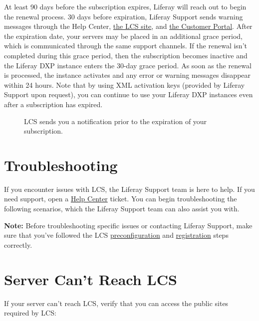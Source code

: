 At least 90 days before the subscription expires, Liferay will reach out
to begin the renewal process. 30 days before expiration, Liferay Support
sends warning messages through the Help Center,
\href{https://lcs.liferay.com}{the LCS site}, and
\href{https://www.liferay.com/group/customer}{the Customer Portal}.
After the expiration date, your servers may be placed in an additional
grace period, which is communicated through the same support channels.
If the renewal isn't completed during this grace period, then the
subscription becomes inactive and the Liferay DXP instance enters the
30-day grace period. As soon as the renewal is processed, the instance
activates and any error or warning messages disappear within 24 hours.
Note that by using XML activation keys (provided by Liferay Support upon
request), you can continue to use your Liferay DXP instances even after
a subscription has expired.

\begin{figure}
\centering
{}
\caption{LCS sends you a notification prior to the expiration of your
subscription.}
\end{figure}

\section{Troubleshooting}\label{troubleshooting}

If you encounter issues with LCS, the Liferay Support team is here to
help. If you need support, open a
\href{https://help.liferay.com/hc}{Help Center} ticket. You can begin
troubleshooting the following scenarios, which the Liferay Support team
can also assist you with.

\noindent\hrulefill

\textbf{Note:} Before troubleshooting specific issues or contacting
Liferay Support, make sure that you've followed the LCS
\href{/docs/7-2/deploy/-/knowledge_base/d/lcs-preconfiguration}{preconfiguration}
and
\href{/docs/7-2/deploy/-/knowledge_base/d/activating-your-liferay-dxp-server-with-lcs}{registration}
steps correctly.

\noindent\hrulefill

\section{Server Can't Reach LCS}\label{server-cant-reach-lcs}

If your server can't reach LCS, verify that you can access the public
sites required by LCS:

